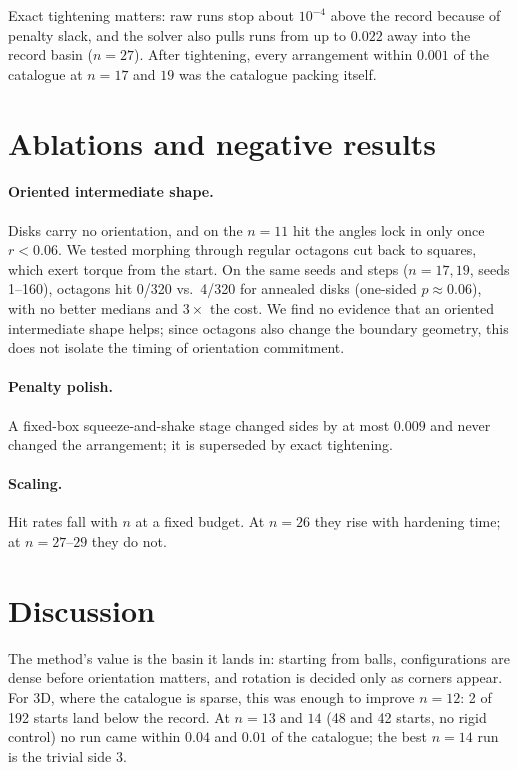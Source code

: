 \documentclass[11pt]{article}
\begin{document}
Exact tightening matters: raw runs stop about $10^{-4}$ above the record because of penalty slack, and the solver also pulls runs from up to $0.022$ away into the record basin ($n=27$). After tightening, every arrangement within $0.001$ of the catalogue at $n=17$ and $19$ was the catalogue packing itself.

\section{Ablations and negative results}\label{sec:ablations}
\paragraph{Oriented intermediate shape.} Disks carry no orientation, and on the $n=11$ hit the angles lock in only once $r<0.06$. We tested morphing through regular octagons cut back to squares, which exert torque from the start. On the same seeds and steps ($n=17,19$, seeds 1--160), octagons hit 0/320 vs.\ 4/320 for annealed disks (one-sided $p\approx0.06$), with no better medians and $3\times$ the cost. We find no evidence that an oriented intermediate shape helps; since octagons also change the boundary geometry, this does not isolate the timing of orientation commitment.

\paragraph{Penalty polish.} A fixed-box squeeze-and-shake stage changed sides by at most $0.009$ and never changed the arrangement; it is superseded by exact tightening.

\paragraph{Scaling.} Hit rates fall with $n$ at a fixed budget. At $n=26$ they rise with hardening time; at $n=27$--$29$ they do not.

\section{Discussion}
The method's value is the basin it lands in: starting from balls, configurations are dense before orientation matters, and rotation is decided only as corners appear. For 3D, where the catalogue is sparse, this was enough to improve $n=12$: 2 of 192 starts land below the record. At $n=13$ and $14$ (48 and 42 starts, no rigid control) no run came within $0.04$ and $0.01$ of the catalogue; the best $n=14$ run is the trivial side $3$.
\end{document}
